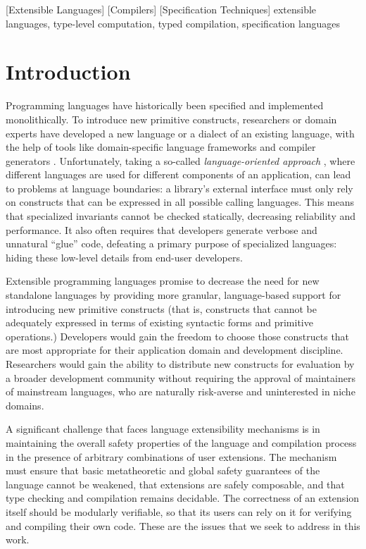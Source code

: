 \documentclass[9pt]{sigplanconf}
\begin{document}
[Extensible Languages]
[Compilers]
[Specification Techniques]
\keywords
extensible languages, type-level computation, typed compilation, specification languages
\section{Introduction}
Programming languages have historically been specified and implemented monolithically. To introduce new primitive constructs, researchers or domain experts have developed a new language or a dialect of an existing language, with the help of tools like domain-specific language frameworks and compiler generators \cite{fowler2010domain}. 
Unfortunately, taking a so-called {\it language-oriented approach} \cite{journals/stp/Ward94}, where different languages are used for different components of an application, can lead to problems at language boundaries: a library's external interface must only rely on  constructs that can be expressed in all possible calling languages. This means that specialized invariants cannot be checked statically, decreasing reliability and performance. It also often requires that developers generate verbose and unnatural ``glue'' code, defeating a primary purpose of specialized languages: hiding these low-level details from end-user developers.

Extensible programming languages promise to decrease the need for new standalone languages by providing more granular, language-based support for introducing new primitive constructs (that is, constructs that cannot be adequately expressed in terms of existing syntactic forms and primitive operations.) Developers would gain the freedom to choose those constructs that are most appropriate for their application domain and development discipline. Researchers would gain the ability to distribute new constructs for evaluation by a broader development community without requiring the approval of maintainers of mainstream languages, who are naturally risk-averse and uninterested in niche domains.

A significant challenge that faces language extensibility mechanisms is in maintaining the overall safety properties of the language and compilation process in the presence of arbitrary combinations of user extensions. The mechanism must ensure that basic metatheoretic and global safety guarantees of the language cannot be weakened, that extensions are safely composable, and that type checking and compilation remains decidable. The correctness of an extension itself should be modularly verifiable, so that its users can rely on it for verifying and compiling their own code. These are the issues that we seek to address in this work.
\end{document}

